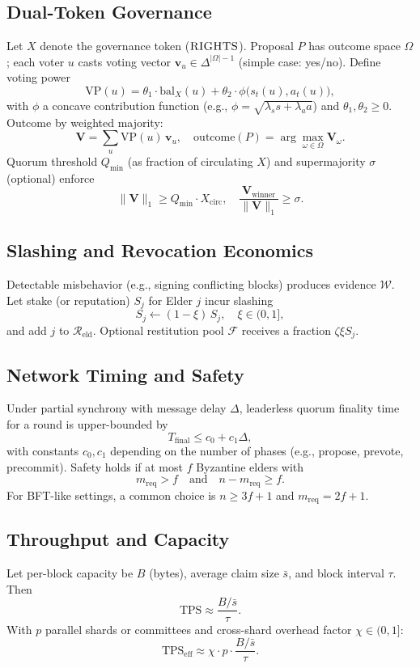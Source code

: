 \documentclass[11pt,a4paper]{article}
\begin{document}
\subsection{Dual-Token Governance}
Let $X$ denote the governance token ($\textsc{RIGHTS}$). Proposal $P$ has outcome space $\Omega$; each voter $u$ casts voting vector $\mathbf{v}_u\in \Delta^{|\Omega|-1}$ (simple case: yes/no). Define voting power
\[
\mathrm{VP}(u) = \theta_1 \cdot \mathrm{bal}_X(u) + \theta_2 \cdot \phi\big(s_t(u), a_t(u)\big),
\]
with $\phi$ a concave contribution function (e.g., $\phi=\sqrt{\lambda_s s+\lambda_a a}$) and $\theta_1,\theta_2\ge 0$.
Outcome by weighted majority:
\[
\mathbf{V} = \sum_{u} \mathrm{VP}(u)\,\mathbf{v}_u,\quad \mathrm{outcome}(P)=\arg\max_{\omega\in\Omega}\mathbf{V}_\omega.
\]
Quorum threshold $Q_{\min}$ (as fraction of circulating $X$) and supermajority $\sigma$ (optional) enforce
\[
\|\mathbf{V}\|_1 \ge Q_{\min}\cdot X_{\text{circ}},\quad \frac{\mathbf{V}_{\text{winner}}}{\|\mathbf{V}\|_1}\ge \sigma.
\]

\subsection{Slashing and Revocation Economics}
Detectable misbehavior (e.g., signing conflicting blocks) produces evidence $\mathcal{W}$. Let stake (or reputation) $S_j$ for Elder $j$ incur slashing
\[
S_j \leftarrow (1-\xi)\,S_j,\quad \xi\in(0,1],
\]
and add $j$ to $\mathcal{R}_{\text{eld}}$. Optional restitution pool $\mathcal{F}$ receives a fraction $\zeta\xi S_j$.

\subsection{Network Timing and Safety}
Under partial synchrony with message delay $\Delta$, leaderless quorum finality time for a round is upper-bounded by
\[
T_{\mathrm{final}} \le c_0 + c_1 \Delta,
\]
with constants $c_0,c_1$ depending on the number of phases (e.g., propose, prevote, precommit). Safety holds if at most $f$ Byzantine elders with
\[
m_{\mathrm{req}} > f \quad \text{and} \quad n - m_{\mathrm{req}} \ge f.
\]
For BFT-like settings, a common choice is $n\ge 3f+1$ and $m_{\mathrm{req}} = 2f+1$.

\subsection{Throughput and Capacity}
Let per-block capacity be $B$ (bytes), average claim size $\bar{s}$, and block interval $\tau$. Then
\[
\mathrm{TPS} \approx \frac{B/\bar{s}}{\tau}.
\]
With $p$ parallel shards or committees and cross-shard overhead factor $\chi\in(0,1]$:
\[
\mathrm{TPS}_{\text{eff}} \approx \chi \cdot p \cdot \frac{B/\bar{s}}{\tau}.
\]
\end{document}
